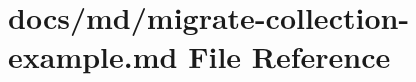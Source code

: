 \hypertarget{migrate-collection-example_8md}{}\section{docs/md/migrate-\/collection-\/example.md File Reference}
\label{migrate-collection-example_8md}
